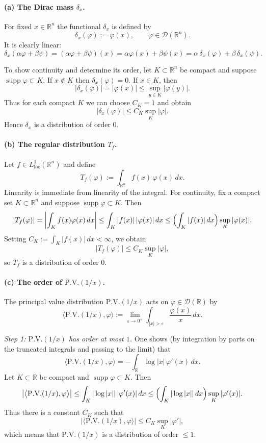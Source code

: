 \documentclass[12pt,a4paper]{article}
\theoremstyle{plain}
\theoremstyle{definition}
\theoremstyle{remark}
\theoremstyle{remark}
\begin{document}
\bigskip


	\paragraph{(a) The Dirac mass $\delta_x$.}
	For fixed $x\in\mathbb{R}^n$ the functional $\delta_x$ is defined by
	\[
	\delta_x(\varphi) := \varphi(x), \qquad \varphi\in\mathcal{D}(\mathbb{R}^n).
	\]
	It is clearly linear:
	\[
	\delta_x(\alpha\varphi+\beta\psi)
	= (\alpha\varphi+\beta\psi)(x)
	= \alpha\varphi(x)+\beta\psi(x)
	= \alpha\,\delta_x(\varphi)+\beta\,\delta_x(\psi).
	\]
	
	To show continuity and determine its order, let $K\subset\mathbb{R}^n$
	be compact and suppose $\operatorname{supp}\varphi\subset K$.
	If $x\notin K$ then $\delta_x(\varphi)=0$.  If $x\in K$, then
	\[
	|\delta_x(\varphi)| = |\varphi(x)| \le \sup_{y\in K}|\varphi(y)|.
	\]
	Thus for each compact $K$ we can choose $C_K=1$ and obtain
	\[
	|\delta_x(\varphi)|
	\le C_K \sup_{K}|\varphi|.
	\]
	Hence $\delta_x$ is a distribution of order $0$.
	
	\paragraph{(b) The regular distribution $T_f$.}
	Let $f\in L^1_{\mathrm{loc}}(\mathbb{R}^n)$ and define
	\[
	T_f(\varphi) := \int_{\mathbb{R}^n} f(x)\,\varphi(x)\,dx.
	\]
	Linearity is immediate from linearity of the integral.  For continuity,
	fix a compact set $K\subset\mathbb{R}^n$ and suppose
	$\operatorname{supp}\varphi\subset K$. Then
	\[
	|T_f(\varphi)|
	= \left|\int_{K} f(x)\varphi(x)\,dx\right|
	\le \int_{K} |f(x)|\,|\varphi(x)|\,dx
	\le \Bigl(\int_{K} |f(x)|\,dx\Bigr) \sup_{K}|\varphi(x)|.
	\]
	Setting $C_K := \int_{K}|f(x)|\,dx<\infty$, we obtain
	\[
	|T_f(\varphi)| \le C_K \sup_{K}|\varphi|,
	\]
	so $T_f$ is a distribution of order $0$.
	
	\paragraph{(c) The order of $\mathrm{P.V.}(1/x)$.}
	The principal value distribution $\mathrm{P.V.}(1/x)$ acts on
	$\varphi\in\mathcal{D}(\mathbb{R})$ by
	\[
	\bigl\langle \mathrm{P.V.}(1/x), \varphi \bigr\rangle
	:= \lim_{\varepsilon\to0^+}
	\int_{|x|>\varepsilon} \frac{\varphi(x)}{x}\,dx.
	\]
	
	\emph{Step 1: $\mathrm{P.V.}(1/x)$ has order at most $1$.}
	One shows (by integration by parts on the truncated integrals and
	passing to the limit) that
	\[
	\bigl\langle \mathrm{P.V.}(1/x), \varphi \bigr\rangle
	= -\int_{\mathbb{R}} \log|x|\,\varphi'(x)\,dx.
	\]
	Let $K\subset\mathbb{R}$ be compact and $\operatorname{supp}\varphi\subset K$.
	Then
	\[
	\left|\bigl\langle \mathrm{P.V.}(1/x), \varphi \bigr\rangle\right|
	\le \int_{K}|\log|x||\,|\varphi'(x)|\,dx
	\le \Bigl(\int_{K}|\log|x||\,dx\Bigr)\sup_{K}|\varphi'(x)|.
	\]
	Thus there is a constant $C_K$ such that
	\[
	\left|\bigl\langle \mathrm{P.V.}(1/x), \varphi \bigr\rangle\right|
	\le C_K \sup_{K}|\varphi'|,
	\]
	which means that $\mathrm{P.V.}(1/x)$ is a distribution of order
	$\le 1$.
	
\end{document}
